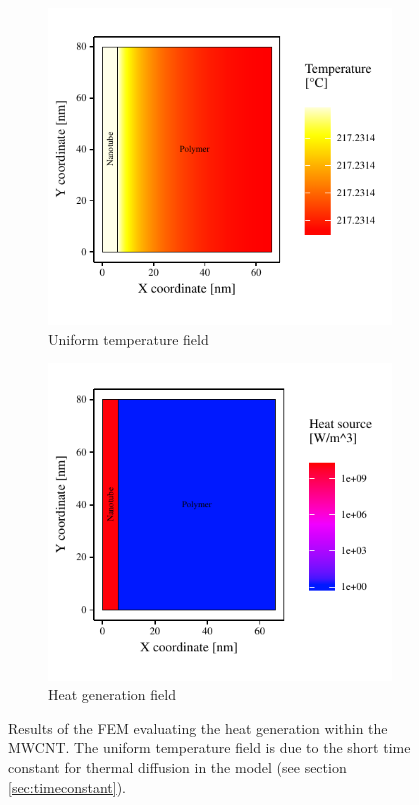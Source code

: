 \documentclass[11pt,review,times]{article}
\begin{document}
\begin{figure}[htb]
	\centering
	\captionsetup{width=\textwidth}
	\begin{subfigure}{0.49\textwidth}
		\centering
		\captionsetup{width=0.9\textwidth}
		\includegraphics[width=\textwidth]{resultats_comsol_axisymetrique_temp}
		\caption{Uniform temperature field}
		\label{fig:temp_axysymmetric}
	\end{subfigure}
	\begin{subfigure}{0.49\textwidth}
		\centering
		\captionsetup{width=0.9\textwidth}
		\includegraphics[width=\textwidth]{resultats_comsol_axisymetrique_puissance}
		\caption{Heat generation field}
		\label{fig:heat_axysymmetric}
	\end{subfigure}%
	\caption{Results of the FEM evaluating the heat generation within the MWCNT. The uniform temperature field is due to the short time constant for thermal diffusion in the model (see section \ref{sec:timeconstant}).}
	\label{fig:results_axysymmetric}
\end{figure}
\end{document}
